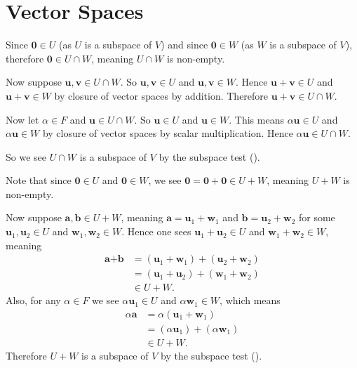 \section{Vector Spaces}
\begin{questions}
    \item \begin{partquestions}{\alph*}
        \item Since $\textbf{0} \in U$ (as $U$ is a subspace of $V$) and since $\textbf{0} \in W$ (as $W$ is a subspace of $V$), therefore $\textbf{0} \in U \cap W$, meaning $U \cap W$ is non-empty.

        Now suppose $\textbf{u}, \textbf{v} \in U \cap W$. So $\textbf{u}, \textbf{v} \in U$ and $\textbf{u}, \textbf{v} \in W$. Hence $\textbf{u} + \textbf{v} \in U$ and $\textbf{u} + \textbf{v} \in W$ by closure of vector spaces by addition. Therefore $\textbf{u} + \textbf{v} \in U \cap W$.

        Now let $\alpha \in F$ and $\textbf{u} \in U \cap W$. So $\textbf{u} \in U$ and $\textbf{u} \in W$. This means $\alpha\textbf{u} \in U$ and $\alpha\textbf{u} \in W$ by closure of vector spaces by scalar multiplication. Hence $\alpha\textbf{u} \in U \cap W$.

        So we see $U \cap W$ is a subspace of $V$ by the subspace test ().

        \item Note that since $\textbf{0} \in U$ and $\textbf{0} \in W$, we see $\textbf{0} = \textbf{0} + \textbf{0} \in U + W$, meaning $U + W$ is non-empty.

        Now suppose $\textbf{a}, \textbf{b} \in U + W$, meaning $\textbf{a} = \textbf{u}_1 + \textbf{w}_1$ and $\textbf{b} = \textbf{u}_2 + \textbf{w}_2$ for some $\textbf{u}_1, \textbf{u}_2 \in U$ and $\textbf{w}_1, \textbf{w}_2 \in W$. Hence one sees $\textbf{u}_1 + \textbf{u}_2 \in U$ and $\textbf{w}_1 + \textbf{w}_2 \in W$, meaning
        \begin{align*}
            \textbf{a} + \textbf{b} &= (\textbf{u}_1 + \textbf{w}_1) + (\textbf{u}_2 + \textbf{w}_2)\\
            &= (\textbf{u}_1 + \textbf{u}_2) + (\textbf{w}_1 + \textbf{w}_2)\\
            &\in U + W.
        \end{align*}
        Also, for any $\alpha \in F$ we see $\alpha\textbf{u}_1 \in U$ and $\alpha\textbf{w}_1 \in W$, which means
        \begin{align*}
            \alpha\textbf{a} &= \alpha(\textbf{u}_1 + \textbf{w}_1)\\
            &= (\alpha\textbf{u}_1) + (\alpha\textbf{w}_1)\\
            &\in U + W.
        \end{align*}
        Therefore $U + W$ is a subspace of $V$ by the subspace test ().
    \end{partquestions}


\end{questions}
